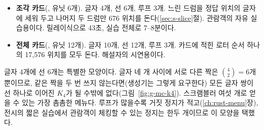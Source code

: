 \begin{itemize}
\item \textbf{조각 카드}(, 유닛 6개). 글자 4개, 선 6개, 루프 3개. 느린 드럼을 정답 위치의 글자에 세워 두고
나머지 두 드럼만 676 위치를 돈다(\ref{sec:s-slice}절). 관람객의 자유 실습용이다. 릴레이식으로 43초, 실습 전체로
7--8분이다.
\item \textbf{전체 카드}(, 유닛 12개). 글자 10개, 선 12개, 루프 3개. 카드에 적힌 로터 순서 하나의 17,576
위치를 모두 돈다. 해설자의 시연용이다.
\end{itemize}

\Why 글자 4개에 선 6개는 특별한 모양이다. 글자 네 개 사이에 서로 다른 짝은 $\binom{4}{2} = 6$개뿐이므로, 같은 짝을
두 번 쓰지 않는다면(생성기는 그렇게 요구한다) 모든 글자 쌍이 선 하나로 이어진 
$K_4$가 될 수밖에 없다(그림~\ref{fig:g-mc-k4}). 스크램블러 여섯 개로 얻을 수 있는 가장 촘촘한 메뉴다. 루프가 많을수록
거짓 정지가 적고(\ref{ch:rust-menu}장), 전시의 짧은 실습에서 관람객이 체킹할 수 있는 정지는 한두 개이므로 이 모양을
택했다.

